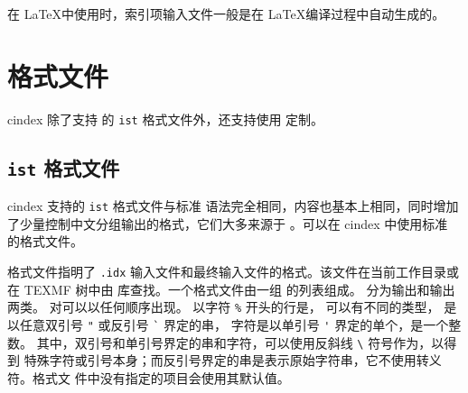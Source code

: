 \documentclass[class=article,doc={kv-usage}]{cusdoc}
\newcommand*\LUA{\texorpdfstring{\textcon{lua}}{lua}}
\begin{document}
在 \LaTeX 中使用时，索引项输入文件一般是在 \LaTeX 编译过程中自动生成的。


\section{格式文件}

cindex 除了支持  的 \texttt{ist} 格式文件外，还支持使用 \LUA 定制。

\subsection{\texttt{ist} 格式文件}

cindex 支持的 \texttt{ist} 格式文件与标准  语法完全相同，内容也基本上相同，同时增加了少量控制中文分组输出的格式，它们大多来源于 。可以在 cindex 中使用标准  的格式文件。

格式文件指明了 \texttt{.idx} 输入文件和最终输入文件的格式。该文件在当前工作目录或在
TEXMF 树中由  库查找。一个格式文件由一组   的列表组成。 分为输出和输出两类。  对可以以任何顺序出现。
以字符 \verb"%" 开头的行是，
 可以有不同的类型，
是以任意双引号 \verb|"| 或反引号 \verb|`| 界定的串，
字符是以单引号 \verb|'| 界定的单个，是一个整数。
其中，双引号和单引号界定的串和字符，可以使用反斜线 \verb"\" 符号作为，以得到
特殊字符或引号本身；而反引号界定的串是表示原始字符串，它不使用转义符。格式文
件中没有指定的项目会使用其默认值。
\end{document}
